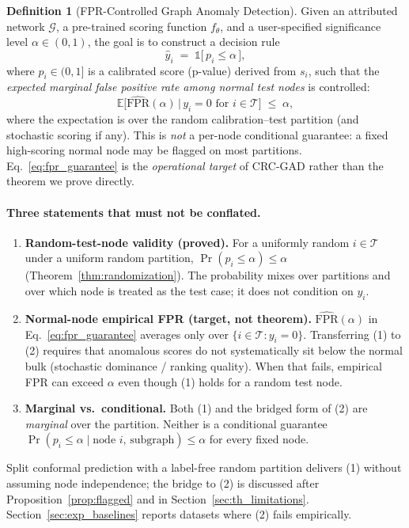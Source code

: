 \documentclass[a4paper]{cas-dc}
\theoremstyle{definition}
\newtheorem{definition}{Definition}
\begin{document}
\begin{definition}[FPR-Controlled Graph Anomaly Detection]
\label{def:fpr}
Given an attributed network $\mathcal{G}$, a pre-trained scoring function $f_\theta$, and a user-specified significance level $\alpha \in (0, 1)$, the goal is to construct a decision rule
\begin{equation}
\label{eq:decision}
    \hat{y}_i \;=\; \mathbb{1}\bigl[\,p_i \leq \alpha\,\bigr],
\end{equation}
where $p_i \in (0, 1]$ is a calibrated score (p-value) derived from $s_i$, such that the \emph{expected marginal false positive rate among normal test nodes} is controlled:
\begin{equation}
\label{eq:fpr_guarantee}
    \mathbb{E}\bigl[\widehat{\mathrm{FPR}}(\alpha)\,\big|\, y_i = 0 \text{ for } i \in \mathcal{T}\bigr] \;\leq\; \alpha,
\end{equation}
where the expectation is over the random calibration--test partition (and stochastic scoring if any).  This is \emph{not} a per-node conditional guarantee: a fixed high-scoring normal node may be flagged on most partitions.  Eq.~\eqref{eq:fpr_guarantee} is the \emph{operational target} of CRC-GAD rather than the theorem we prove directly.

\paragraph{Three statements that must not be conflated.}
\begin{enumerate}
  \item \textbf{Random-test-node validity (proved).} For a uniformly random $i\in\mathcal{T}$ under a uniform random partition, $\Pr(p_i\leq\alpha)\leq\alpha$ (Theorem~\ref{thm:randomization}). The probability mixes over partitions and over which node is treated as the test case; it does not condition on $y_i$.
  \item \textbf{Normal-node empirical FPR (target, not theorem).} $\widehat{\mathrm{FPR}}(\alpha)$ in Eq.~\eqref{eq:fpr_guarantee} averages only over $\{i\in\mathcal{T}:y_i=0\}$. Transferring (1) to (2) requires that anomalous scores do not systematically sit below the normal bulk (stochastic dominance / ranking quality). When that fails, empirical FPR can exceed $\alpha$ even though (1) holds for a random test node.
  \item \textbf{Marginal vs.\ conditional.} Both (1) and the bridged form of (2) are \emph{marginal} over the partition. Neither is a conditional guarantee $\Pr(p_i\leq\alpha\mid \text{node }i,\,\text{subgraph})\leq\alpha$ for every fixed node.
\end{enumerate}
Split conformal prediction with a label-free random partition delivers (1) without assuming node independence; the bridge to (2) is discussed after Proposition~\ref{prop:flagged} and in Section~\ref{sec:th_limitations}. Section~\ref{sec:exp_baselines} reports datasets where (2) fails empirically.
\end{definition}
\end{document}
